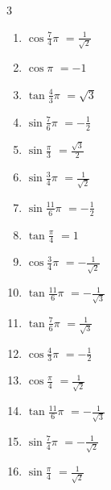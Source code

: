 \begin{multicols}{3}
\begin{enumerate}
  \item $\displaystyle \cos{\frac{7}{4}\pi}$
        $\displaystyle =\frac{1}{\sqrt{2}}$

  \item $\displaystyle \cos{\pi}$
        $\displaystyle =-1$

  \item $\displaystyle \tan{\frac{4}{3}\pi}$
        $\displaystyle =\sqrt{3}$

  \item $\displaystyle \sin{\frac{7}{6}\pi}$
        $\displaystyle =-\frac{1}{2}$

  \item $\displaystyle \sin{\frac{\pi}{3}}$
        $\displaystyle =\frac{\sqrt{3}}{2}$

  \item $\displaystyle \sin{\frac{3}{4}\pi}$
        $\displaystyle =\frac{1}{\sqrt{2}}$

  \item $\displaystyle \sin{\frac{11}{6}\pi}$
        $\displaystyle =-\frac{1}{2}$

  \item $\displaystyle \tan{\frac{\pi}{4}}$
        $\displaystyle =1$

  \item $\displaystyle \cos{\frac{3}{4}\pi}$
        $\displaystyle =-\frac{1}{\sqrt{2}}$

  \item $\displaystyle \tan{\frac{11}{6}\pi}$
        $\displaystyle =-\frac{1}{\sqrt{3}}$

  \item $\displaystyle \tan{\frac{7}{6}\pi}$
        $\displaystyle =\frac{1}{\sqrt{3}}$

  \item $\displaystyle \cos{\frac{4}{3}\pi}$
        $\displaystyle =-\frac{1}{2}$

  \item $\displaystyle \cos{\frac{\pi}{4}}$
        $\displaystyle =\frac{1}{\sqrt{2}}$

  \item $\displaystyle \tan{\frac{11}{6}\pi}$
        $\displaystyle =-\frac{1}{\sqrt{3}}$

  \item $\displaystyle \sin{\frac{7}{4}\pi}$
        $\displaystyle =-\frac{1}{\sqrt{2}}$

  \item $\displaystyle \sin{\frac{\pi}{4}}$
        $\displaystyle =\frac{1}{\sqrt{2}}$


\end{enumerate}
\end{multicols}
